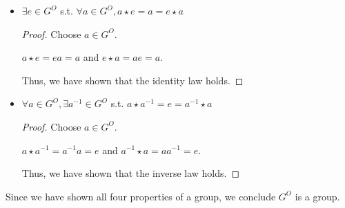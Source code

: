 \documentclass[12pt,letterpaper]{article}
\begin{document}
\begin{enumerate}
\begin{itemize}
\begin{proof}
            \begin{align*}
              a \star (b \star c) &= a \star (cb) \\
              &= (cb)a \tag{left} \label{left}
            \end{align*}
            \begin{align*}
              (a \star b) \star c) &= c(a \star b) \\
              &= c(ba) \tag{right} \label{right}
            \end{align*}

            Since we know the underlying group $G$, we know that it is associative.
            So \ref{left} = \ref{right} since $G$ is associative.

            Thus, we have shown that the associativity law holds.
          \end{proof}
        \item $\exists e \in G^O$ s.t. $\forall a \in G^O, a \star e = a = e \star a$
          \begin{proof}
            Choose $a \in G^O$.

            $a \star e = ea = a$ and $e \star a = ae = a$.

            Thus, we have shown that the identity law holds.
          \end{proof}
        \item $\forall a \in G^O, \exists a^{-1} \in G^O$ s.t. $a \star a^{-1} = e = a^{-1} \star a$

          \begin{proof}
            Choose $a \in G^O$.

            $a \star a^{-1} = a^{-1}a = e$ and $a^{-1} \star a = aa^{-1} = e$.

            Thus, we have shown that the inverse law holds.
          \end{proof}
      \end{itemize}

      Since we have shown all four properties of a group,
      we conclude $G^O$ is a group.


\end{enumerate}
\end{document}
